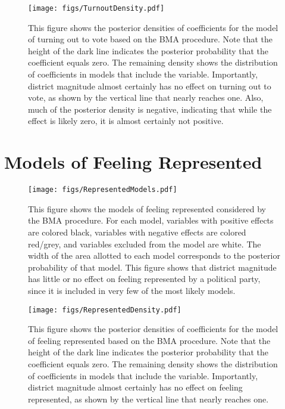 \documentclass[12pt]{article}
\begin{document}
\begin{figure}[h!]
\centering
\texttt{[image: figs/TurnoutDensity.pdf]}
\caption{This figure shows the posterior densities of coefficients for the model of turning out to vote based on the BMA procedure. Note that the height of the dark line indicates the posterior probability that the coefficient equals zero. The remaining density shows the distribution of coefficients in models that include the variable. Importantly, district magnitude almost certainly has no effect on turning out to vote, as shown by the vertical line that nearly reaches one. Also, much of the posterior density is negative, indicating that while the effect is likely zero, it is almost certainly not positive.}\label{fig:TurnoutDensity}
\end{figure}

\clearpage

\section{Models of Feeling Represented}

\begin{figure}[h]
\centering
\texttt{[image: figs/RepresentedModels.pdf]}
\caption{This figure shows the models of feeling represented considered by the BMA procedure. For each model, variables with positive effects are colored black, variables with negative effects are colored red/grey, and variables excluded from the model are white. The width of the area allotted to each model corresponds to the posterior probability of that model. This figure shows that district magnitude has little or no effect on feeling represented by a political party, since it is included in very few of the most likely models.}\label{fig:RepresentedModels}
\end{figure}

\begin{figure}[h]
\centering
\texttt{[image: figs/RepresentedDensity.pdf]}
\caption{This figure shows the posterior densities of coefficients for the model of feeling represented based on the BMA procedure. Note that the height of the dark line indicates the posterior probability that the coefficient equals zero. The remaining density shows the distribution of coefficients in models that include the variable. Importantly, district magnitude almost certainly has no effect on feeling represented, as shown by the vertical line that nearly reaches one.}\label{fig:RepresentedDensity}
\end{figure}
\end{document}
